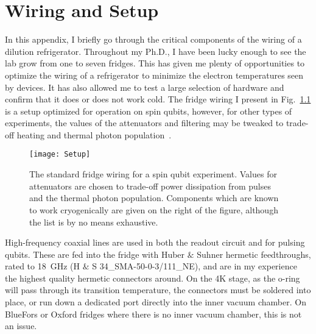 \chapter{Wiring and Setup}
\label{sec:setup}

In this appendix, I briefly go through the critical components of the wiring of a dilution refrigerator.
Throughout my Ph.D., I have been lucky enough to see the lab grow from one to seven fridges. This has given me
plenty of opportunities to optimize the wiring of a refrigerator to minimize the electron temperatures seen by
devices. It has also allowed me to test a large selection of hardware and confirm that it does or does not work
cold. The fridge wiring I present in Fig.~\ref{fig:wiring} is a setup optimized for operation on spin qubits, however,
for other types of experiments, the values of the attenuators and filtering may be tweaked to trade-off heating and thermal
photon population~\cite{Krinner2019}.

\begin{figure}
    \texttt{[image: Setup]}
    \caption[Standard wiring diagram for a dilution refrigerator]
    {\label{fig:wiring}The standard fridge wiring for a spin qubit experiment. Values for attenuators are chosen to trade-off power dissipation from pulses and the thermal photon population. Components which are known to work cryogenically are given on the right of the figure, although the list is by no means exhaustive.}
\end{figure}

High-frequency coaxial lines are used in both the readout circuit and for pulsing qubits. These are fed into
the fridge with Huber $\&$ Suhner hermetic feedthroughs, rated to \SI{18}{\giga\hertz} (H $\&$ S 34\_SMA-50-0-3/111\_NE),
and are in my experience the highest quality hermetic connectors around. On the 4K stage, as the o-ring will pass
through its transition temperature, the connectors must be soldered into place, or run down a dedicated port
directly into the inner vacuum chamber. On BlueFors or Oxford fridges where there is no inner vacuum chamber,
this is not an issue.

